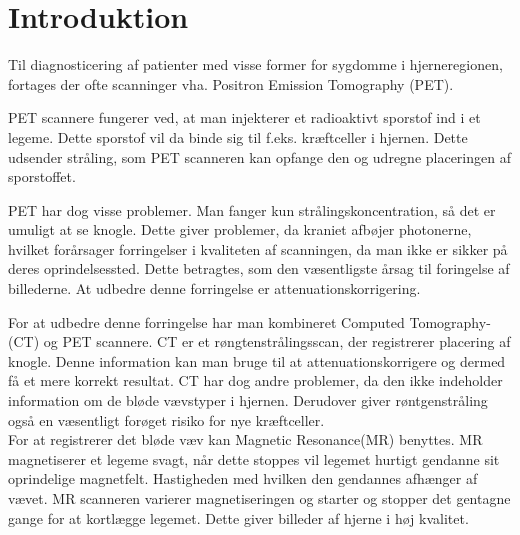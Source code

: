 \section{Introduktion}




Til diagnosticering af patienter med visse former for sygdomme i hjerneregionen, fortages der ofte scanninger vha. Positron Emission Tomography (PET). 

PET scannere fungerer ved, at man injekterer et radioaktivt sporstof ind i et legeme. Dette sporstof vil da binde sig til f.eks. kræftceller i hjernen. Dette udsender stråling, som PET scanneren kan opfange den og udregne placeringen af sporstoffet.\\


PET har dog visse problemer. Man fanger kun strålingskoncentration, så det er umuligt at se knogle. Dette giver problemer, da kraniet afbøjer photonerne, hvilket forårsager forringelser i kvaliteten af scanningen, da man ikke er sikker på deres oprindelsessted. Dette betragtes, som den væsentligste årsag til foringelse af billederne.  At udbedre denne forringelse er attenuationskorrigering.

For at udbedre denne forringelse har man kombineret Computed Tomography- (CT) og PET scannere. CT er et røngtenstrålingsscan, der registrerer placering af knogle. Denne information kan man bruge til at attenuationskorrigere og dermed få et mere korrekt resultat. CT har dog andre problemer, da den ikke indeholder information om de bløde vævstyper i hjernen. Derudover giver røntgenstråling også en væsentligt forøget risiko for nye kræftceller.  \\

For at registrerer det bløde væv kan Magnetic Resonance(MR) benyttes. MR magnetiserer et legeme svagt, når dette stoppes vil legemet hurtigt gendanne sit oprindelige magnetfelt. Hastigheden med hvilken den gendannes afhænger af vævet. MR scanneren varierer magnetiseringen og starter og stopper det gentagne gange for at kortlægge legemet. Dette giver billeder af hjerne i høj kvalitet. 

